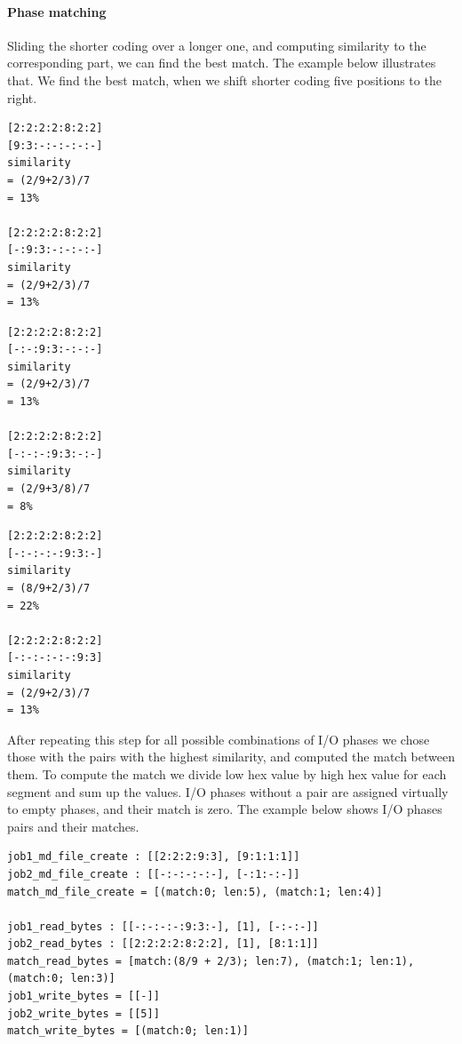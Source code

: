 \documentclass[]{llncs}
\begin{document}
\paragraph{Phase matching}
Sliding the shorter coding over a longer one, and computing similarity to the corresponding part, we can find the best match.
The example below illustrates that.
We find the best match, when we shift shorter coding five positions to the right.
\noindent\begin{minipage}{0.33\textwidth}
\begin{lstlisting}
[2:2:2:2:8:2:2]
[9:3:-:-:-:-:-]
similarity 
= (2/9+2/3)/7 
= 13%

[2:2:2:2:8:2:2]
[-:9:3:-:-:-:-]
similarity 
= (2/9+2/3)/7 
= 13%
\end{lstlisting}
\end{minipage}
%
\noindent\begin{minipage}{0.33\textwidth}
\begin{lstlisting}
[2:2:2:2:8:2:2]
[-:-:9:3:-:-:-]
similarity 
= (2/9+2/3)/7 
= 13%

[2:2:2:2:8:2:2]
[-:-:-:9:3:-:-]
similarity 
= (2/9+3/8)/7
= 8%
\end{lstlisting}
\end{minipage}
%
\noindent\begin{minipage}{0.33\textwidth}
\begin{lstlisting}
[2:2:2:2:8:2:2]
[-:-:-:-:9:3:-]
similarity
= (8/9+2/3)/7
= 22%

[2:2:2:2:8:2:2]
[-:-:-:-:-:9:3]
similarity 
= (2/9+2/3)/7 
= 13%
\end{lstlisting}
\end{minipage}

After repeating this step for all possible combinations of I/O phases we chose those with the pairs with the highest similarity, and computed the match between them.
To compute the match we divide low hex value by high hex value for each segment and sum up the values.
I/O phases without a pair are assigned virtually to empty phases, and their match is zero.
The example below shows I/O phases pairs and their matches.
\begin{lstlisting}
job1_md_file_create : [[2:2:2:9:3], [9:1:1:1]]
job2_md_file_create : [[-:-:-:-:-], [-:1:-:-]]
match_md_file_create = [(match:0; len:5), (match:1; len:4)]
 
job1_read_bytes : [[-:-:-:-:9:3:-], [1], [-:-:-]]
job2_read_bytes : [[2:2:2:2:8:2:2], [1], [8:1:1]]
match_read_bytes = [match:(8/9 + 2/3); len:7), (match:1; len:1), (match:0; len:3)]
job1_write_bytes = [[-]]
job2_write_bytes = [[5]]
match_write_bytes = [(match:0; len:1)]
\end{lstlisting}
\end{document}
